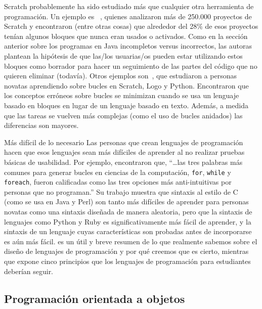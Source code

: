 
Scratch probablemente ha sido estudiado más que cualquier otra herramienta de programación.
Un ejemplo es ~\cite{Aiva2016},
quienes analizaron más de 250.000 proyectos de Scratch
y encontraron (entre otras cosas) que alrededor del 28\% de esos proyectos tenían algunos bloques que nunca eran usados o activados.
Como en la sección anterior sobre los programas en Java incompletos versus incorrectos,
las autoras plantean la hipótesis de que las/los usuarias/os pueden estar utilizando estos bloques como borrador
para hacer un seguimiento de las partes del código que no quieren eliminar (todavía).
Otros ejemplos son~\cite{Grov2017,Mlad2017},
que estudiaron a personas novatas aprendiendo sobre bucles en Scratch, Logo y Python.
Encontraron que los conceptos erróneos sobre bucles se minimizan cuando se usa un lenguaje basado en bloques
en lugar de un lenguaje basado en texto.
Además,
a medida que las tareas se vuelven más complejas (como el uso de bucles anidados)
las diferencias son mayores.

\begin{aside}{Más difícil de lo necesario}
  Las personas que crean lenguajes de programación hacen que esos lenguajes sean más difíciles de aprender al no realizar pruebas básicas de usabilidad.
  Por ejemplo,
  \cite{Stef2013} encontraron que,
  ``{\ldots}las tres palabras más comunes para generar bucles en ciencias de la computación,
  \texttt{for}, \texttt{while} y \texttt{foreach},
  fueron calificadas como las tres opciones más anti-intuitivas por personas que no programan.''
  Su trabajo muestra que sintaxis al estilo de C (como se usa en Java y Perl)
  son tanto más difíciles de aprender para personas novatas como una sintaxis diseñada de manera aleatoria,
  pero que la sintaxis de lenguajes como Python y Ruby
  es significativamente más fácil de aprender,
  y la sintaxis de un lenguaje cuyas características son probadas antes de incorporarse es aún más fácil.
  \cite{Stef2017} es un útil y breve resumen de lo que realmente sabemos sobre el diseño de lenguajes de programación
  y por qué creemos que es cierto,
  mientras que \cite{Guzd2016} expone cinco principios que los lenguajes de programación para estudiantes deberían seguir.
\end{aside}

\subsection*{Programación orientada a objetos}

